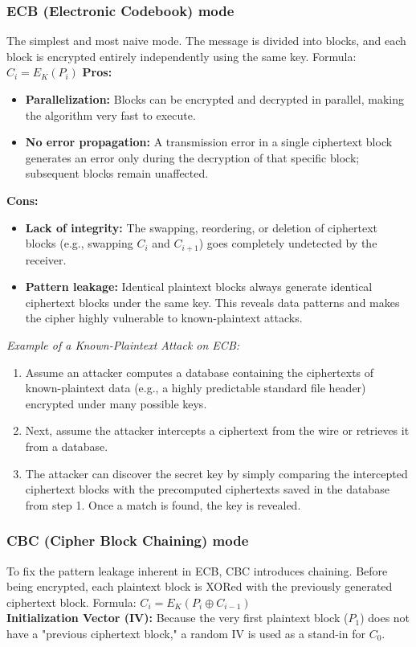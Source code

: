 \subsubsection{ECB (Electronic Codebook) mode}
The simplest and most naive mode. The message is divided into blocks, and each block is encrypted entirely independently using the same key.
Formula: $C_i = E_K(P_i)$
\textbf{Pros:}
\begin{itemize}
    \item \textbf{Parallelization:} Blocks can be encrypted and decrypted in parallel, making the algorithm very fast to execute.
    \item \textbf{No error propagation:} A transmission error in a single ciphertext block generates an error only during the decryption of that specific block; subsequent blocks remain unaffected.
\end{itemize}

\textbf{Cons:}
\begin{itemize}
    \item \textbf{Lack of integrity:} The swapping, reordering, or deletion of ciphertext blocks (e.g., swapping $C_i$ and $C_{i+1}$) goes completely undetected by the receiver.
    \item \textbf{Pattern leakage:} Identical plaintext blocks always generate identical ciphertext blocks under the same key. This reveals data patterns and makes the cipher highly vulnerable to known-plaintext attacks.
\end{itemize}

\textit{Example of a Known-Plaintext Attack on ECB:}
\begin{enumerate}
    \item Assume an attacker computes a database containing the ciphertexts of known-plaintext data (e.g., a highly predictable standard file header) encrypted under many possible keys.
    \item Next, assume the attacker intercepts a ciphertext from the wire or retrieves it from a database.
    \item The attacker can discover the secret key by simply comparing the intercepted ciphertext blocks with the precomputed ciphertexts saved in the database from step 1. Once a match is found, the key is revealed.
\end{enumerate}

\subsubsection{CBC (Cipher Block Chaining) mode} \label{mode:CBC}
To fix the pattern leakage inherent in ECB, CBC introduces chaining. Before being encrypted, each plaintext block is XORed with the previously generated ciphertext block.
Formula: $C_i = E_K(P_i \oplus C_{i-1})$\\
\textbf{Initialization Vector (IV):} Because the very first plaintext block ($P_1$) does not have a "previous ciphertext block," a random IV is used as a stand-in for $C_0$.

